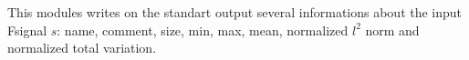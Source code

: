 This modules writes on the standart output several informations about
the input Fsignal $s$: name, comment, size, min, max, mean, normalized
$l^2$ norm and normalized total variation.
